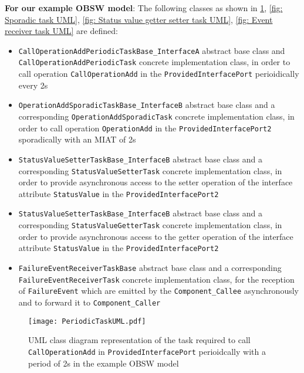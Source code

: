 \textbf{For our example OBSW model}: The following classes as shown in \cref{fig: Periodic task UML}, \cref{fig: Sporadic task UML}, \cref{fig: Status value getter setter task UML}, \cref{fig: Event receiver task UML} are defined:
\begin{itemize}
\item \texttt{CallOperationAdd\allowbreak Periodic\allowbreak TaskBase\allowbreak \_InterfaceA} abstract base class and \texttt{Call\allowbreak OperationAdd\allowbreak Periodic\allowbreak Task} concrete implementation class, in order to call operation \texttt{Call\allowbreak OperationAdd} in the \texttt{Provided\allowbreak Interface\allowbreak Port} perioidically every 2s
\item \texttt{OperationAdd\allowbreak Sporadic\allowbreak TaskBase\allowbreak \_InterfaceB} abstract base class and a corresponding \texttt{Operation\allowbreak Add\allowbreak Sporadic\allowbreak Task} concrete implementation class, in order to call operation \texttt{Operation\allowbreak Add} in the \texttt{Provided\allowbreak Interface\allowbreak Port2} sporadically with an MIAT of 2s
\item \texttt{StatusValue\allowbreak SetterTaskBase\allowbreak \_InterfaceB} abstract base class and a corresponding \texttt{Status\allowbreak Value\allowbreak Setter\allowbreak Task} concrete implementation class, in order to provide asynchronous access to the setter operation of the interface attribute \texttt{Status\allowbreak Value} in the \texttt{Provided\allowbreak Interface\allowbreak Port2}
\item \texttt{StatusValue\allowbreak SetterTaskBase\allowbreak \_InterfaceB} abstract base class and a corresponding \texttt{Status\allowbreak Value\allowbreak Getter\allowbreak Task} concrete implementation class, in order to provide asynchronous access to the getter operation of the interface attribute \texttt{Status\allowbreak Value} in the \texttt{Provided\allowbreak Interface\allowbreak Port2}
\item \texttt{Failure\allowbreak Event\allowbreak Receiver\allowbreak Task\allowbreak Base} abstract base class and a corresponding \texttt{Failure\allowbreak Event\allowbreak Receiver\allowbreak Task} concrete implementation class, for the reception of \texttt{Failure\allowbreak Event} which are emitted by the \texttt{Component\allowbreak\_Callee} asynchronously and to forward it to \texttt{Component\allowbreak\_Caller} 
\end{itemize} 

\begin{figure}[h]
	\centering
	\texttt{[image: PeriodicTaskUML.pdf]}
	\caption{UML class diagram representation of the task required to call \texttt{CallOperationAdd} in \texttt{Provided\allowbreak Interface\allowbreak Port} perioidcally with a period of 2s in the example OBSW model}
	\label{fig: Periodic task UML}
\end{figure}

